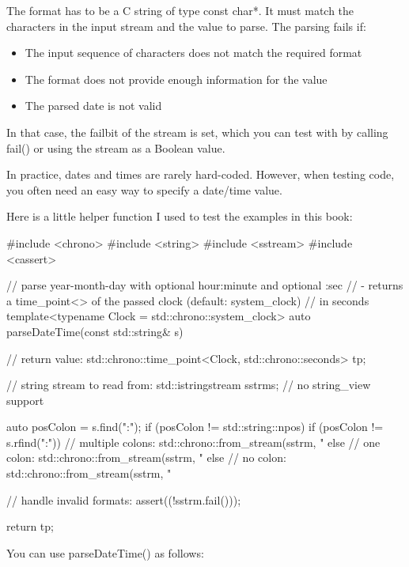 The format has to be a C string of type const char*. It must match the characters in the input stream and the value to parse. The parsing fails if:

\begin{itemize}
\item 
The input sequence of characters does not match the required format

\item 
The format does not provide enough information for the value

\item 
The parsed date is not valid
\end{itemize}

In that case, the failbit of the stream is set, which you can test with by calling fail() or using the stream as a Boolean value.


In practice, dates and times are rarely hard-coded. However, when testing code, you often need an easy way to specify a date/time value.

Here is a little helper function I used to test the examples in this book:


\begin{cpp}
#include <chrono>
#include <string>
#include <sstream>
#include <cassert>

// parse year-month-day with optional hour:minute and optional :sec
// - returns a time_point<> of the passed clock (default: system_clock)
// in seconds
template<typename Clock = std::chrono::system_clock>
auto parseDateTime(const std::string& s)
{
	// return value:
	std::chrono::time_point<Clock, std::chrono::seconds> tp;
	
	// string stream to read from:
	std::istringstream sstrm{s}; // no string_view support
	
	auto posColon = s.find(":");
	if (posColon != std::string::npos) {
		if (posColon != s.rfind(":")) {
			// multiple colons:
			std::chrono::from_stream(sstrm, "%
		}
		else {
			// one colon:
			std::chrono::from_stream(sstrm, "%
		}
	}
	else {
		// no colon:
		std::chrono::from_stream(sstrm, "%
	}
	
	// handle invalid formats:
	assert((!sstrm.fail()));
	
	return tp;
}
\end{cpp}

You can use parseDateTime() as follows:

